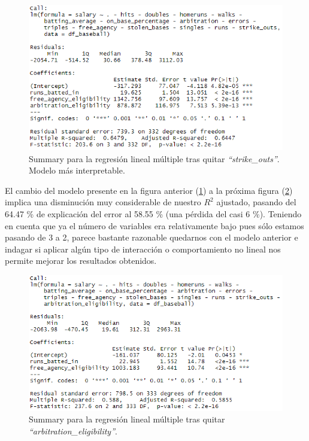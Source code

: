 \documentclass[a4paper,12pt, oneside]{book}
\begin{document}
\begin{figure}[H]
\centering
\includegraphics[scale=0.7]{images/multifit15.PNG}
\caption{Summary para la regresión lineal múltiple tras quitar \textit{``strike\_outs''}. Modelo más interpretable.}
\label{img:reginterpretable}
\end{figure}
El cambio del modelo presente en la figura anterior (\ref{img:reginterpretable}) a la próxima figura (\ref{img:reginterpretable2})
implica una disminución muy considerable de nuestro $R^2$ ajustado, pasando del 64.47 \% de explicación del error al 58.55 \% (una pérdida del casi 6 \%). Teniendo en cuenta que ya el número de variables era relativamente bajo pues sólo estamos pasando de 3 a 2, parece bastante razonable quedarnos con el modelo anterior e indagar si aplicar algún tipo de interacción o comportamiento no lineal nos permite mejorar los resultados obtenidos. \\

\begin{figure}[H]
\centering
\includegraphics[scale=0.7]{images/multifit16.PNG}
\caption{Summary para la regresión lineal múltiple tras quitar \textit{``arbitration\_eligibility''}.}
\label{img:reginterpretable2}
\end{figure}
\end{document}
